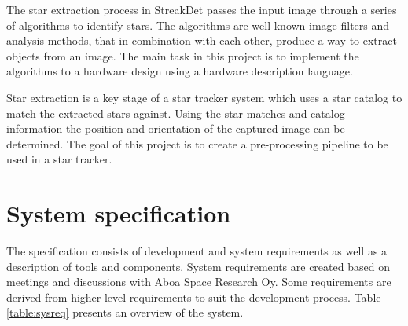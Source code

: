 \documentclass[12pt]{report}
\begin{document}
The star extraction process in StreakDet passes the input image through a series of algorithms to identify stars. The algorithms are well-known image filters and analysis methods, that in combination with each other, produce a way to extract objects from an image. The main task in this project is to implement the algorithms to a hardware design using a hardware description language.
\par
Star extraction is a key stage of a star tracker system which uses a star catalog to match the extracted stars against. Using the star matches and catalog information the position and orientation of the captured image can be determined. The goal of this project is to create a pre-processing pipeline to be used in a star tracker.

\section{System specification}

The specification consists of development and system requirements as well as a description of tools and components. System requirements are created based on meetings and discussions with Aboa Space Research Oy. Some requirements are derived from higher level requirements to suit the development process. Table \ref{table:sysreq} presents an overview of the system.
\end{document}
